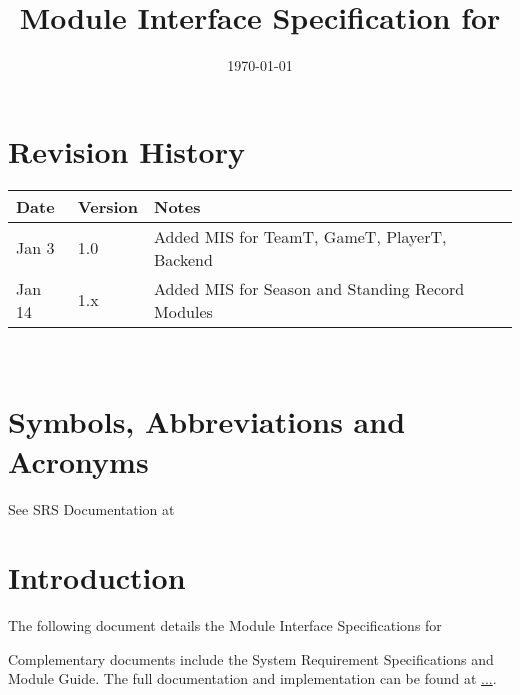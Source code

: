 \documentclass[12pt, titlepage]{article}
\begin{document}
\title{Module Interface Specification for \progname{}}

\author{\authname}

\date{\today}

\maketitle


\section{Revision History}

\begin{tabularx}{\textwidth}{p{3cm}p{2cm}X}
  \toprule {\bf Date} & {\bf Version} & {\bf Notes}                                  \\
  \midrule
  Jan 3               & 1.0           & Added MIS for TeamT, GameT, PlayerT, Backend \\
  Jan 14              & 1.x           & Added MIS for Season and Standing Record Modules                                        \\
  \bottomrule
\end{tabularx}

~\newpage

\section{Symbols, Abbreviations and Acronyms}

See SRS Documentation at 


\newpage

\tableofcontents

\newpage


\section{Introduction}

The following document details the Module Interface Specifications for

Complementary documents include the System Requirement Specifications
and Module Guide.  The full documentation and implementation can be
found at \url{...}.  
\end{document}
